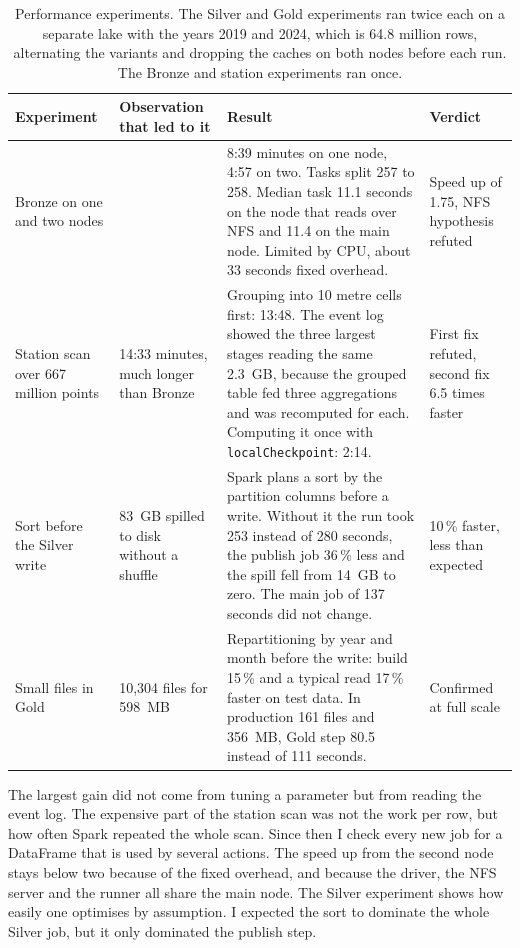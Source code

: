 \documentclass[11pt,a4paper]{article}
\newcommand{\code}[1]{\texttt{\small #1}}
\begin{document}
\begin{table}[tbp]
\small
\begin{tabularx}{\linewidth}{@{}p{2.4cm}p{2.6cm}Lp{2.4cm}@{}}
\toprule
Experiment & Observation that led to it & Result & Verdict \\
\midrule
Bronze on one and two nodes & & 8:39 minutes on one node, 4:57 on two. Tasks split 257 to 258. Median task 11.1 seconds
  on the node that reads over NFS and 11.4 on the main node. Limited by CPU, about 33 seconds fixed overhead. & Speed up of
  1.75, NFS hypothesis refuted \\
\addlinespace
Station scan over 667 million points & 14:33 minutes, much longer than Bronze & Grouping into 10 metre cells first: 13:48.
  The event log showed the three largest stages reading the same 2.3~GB, because the grouped table fed three aggregations
  and was recomputed for each. Computing it once with \code{localCheckpoint}: 2:14. & First fix refuted, second fix 6.5
  times faster \\
\addlinespace
Sort before the Silver write & 83~GB spilled to disk without a shuffle & Spark plans a sort by the partition columns
  before a write. Without it the run took 253 instead of 280 seconds, the publish job 36\,\% less and the spill fell from
  14~GB to zero. The main job of 137 seconds did not change. & 10\,\% faster, less than expected \\
\addlinespace
Small files in Gold & 10,304 files for 598~MB & Repartitioning by year and month before the write: build 15\,\% and a
  typical read 17\,\% faster on test data. In production 161 files and 356~MB, Gold step 80.5 instead of 111 seconds. &
  Confirmed at full scale \\
\bottomrule
\end{tabularx}
\caption{Performance experiments. The Silver and Gold experiments ran twice each on a separate lake with the years 2019 and
2024, which is 64.8 million rows, alternating the variants and dropping the caches on both nodes before each run. The
Bronze and station experiments ran once.}
\label{tab:perf}
\end{table}

The largest gain did not come from tuning a parameter but from reading the event log. The expensive part of the station
scan was not the work per row, but how often Spark repeated the whole scan. Since then I check every new job for a
DataFrame that is used by several actions. The speed up from the second node stays below two because of the fixed
overhead, and because the driver, the NFS server and the runner all share the main node. The Silver experiment shows how
easily one optimises by assumption. I expected the sort to dominate the whole Silver job, but it only dominated the
publish step.
\end{document}
